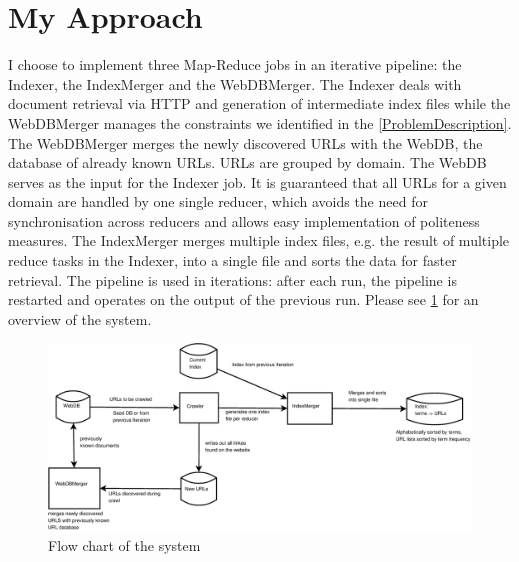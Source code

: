\documentclass[12pt,a4paper]{report}
\begin{document}
\section{My Approach}
I choose to implement three Map-Reduce jobs in an iterative pipeline: the Indexer, the IndexMerger and the WebDBMerger. The Indexer
deals with document retrieval via HTTP and generation of intermediate index files while the WebDBMerger
manages the constraints we identified in the \ref{ProblemDescription}. The WebDBMerger merges the newly discovered URLs
with the WebDB, the database of already known URLs. URLs are grouped by domain. The WebDB serves as the input for the
Indexer job. It is guaranteed that all URLs for a given domain are handled by one single reducer, which avoids the need
for synchronisation across reducers and allows easy implementation of politeness measures.
The IndexMerger merges multiple index files, e.g. the result
of multiple reduce tasks in the Indexer, into a single file and sorts the data for faster retrieval.
The pipeline is used in iterations: after each run, the pipeline is restarted and operates on the output of the previous run. Please
see \ref{FlowChart} for an overview of the system.
\begin{figure}
\includegraphics[scale=1]{Diagramm1.eps} 
\caption{Flow chart of the system}
\label{FlowChart} 
\end{figure}
\end{document}
